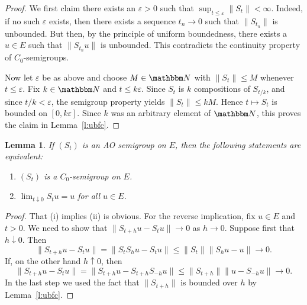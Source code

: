 \documentclass[12pt, reqno]{amsart}
\renewcommand{\leq}{\leqslant}
\newcommand{\1}{\mathbbm 1}
\newcommand{\NN}{\mathbbm N}
\renewcommand{\epsilon}{\varepsilon}
\theoremstyle{plain}
\newtheorem{lemma}[theorem]{Lemma}
\theoremstyle{definition}
\begin{document}
\begin{proof}
    We first claim there exists an $\epsilon > 0$ such that $
    \sup_{t \leq \epsilon} \| S_t \| < \infty$.  Indeed, if no such $\epsilon$
    exists, then there exists a sequence $t_n \to 0$ such that 
    $\|S_{t_n}\|$ is unbounded.  But then, by the principle of uniform
    boundedness, there exists a $u \in E$ such that $\|S_{t_n} u\|$ is
    unbounded.  This contradicts the continuity property of $C_0$-semigroups.

    Now let $\epsilon$ be as above and choose $M \in \NN$ with $\| S_t \| \leq
    M$ whenever $t \leq \epsilon$.  Fix $k \in \NN$ and $t \leq k \epsilon$.
    Since $S_t$ is $k$ compositions of $S_{t/k}$, and since $t/k < \epsilon$, 
    the semigroup property yields $\| S_t \| \leq k M$.  Hence $t \mapsto S_t$
    is bounded on $[0, k \epsilon]$.  Since $k$ was an arbitrary element of
    $\NN$, this proves the claim in Lemma~\ref{l:ubfc}.
\end{proof}

\begin{lemma}\label{l:semiequivcon}
    If $(S_t)$ is an AO semigroup on $E$, then the following
    statements are equivalent:
    \begin{enumerate}
        \item $(S_t)$ is a $C_0$-semigroup on $E$.
        \item $\lim_{t \downarrow 0} S_t u = u$ for all $u \in E$.
    \end{enumerate}
\end{lemma}

\begin{proof}
    That (i) implies (ii) is obvious.  For the reverse implication, fix $u \in E$ and $t > 0$.  We
    need to show that $\|S_{t+h} u - S_t u\| \to 0$ as $h \to 0$.  Suppose first
    that $h \downarrow 0$.  Then
    \begin{equation*}
        \|S_{t+h} u - S_t u\|  
        = \|S_t S_h u - S_t u\|  
        \leq \|S_t \| \| S_h u - u\|  \to 0.
    \end{equation*}
    If, on the other hand $h \uparrow 0$, then
    \begin{equation*}
        \|S_{t+h} u - S_t u\|  
        = \|S_{t+h} u - S_{t + h} S_{-h} u\|  
        \leq \|S_{t+h} \| \| u - S_{-h} u\| \to 0 .
    \end{equation*}
    In the last step we used the fact that $\|S_{t+h} \| $ is bounded over $h$
    by Lemma~\ref{l:ubfc}.
\end{proof}
\end{document}
